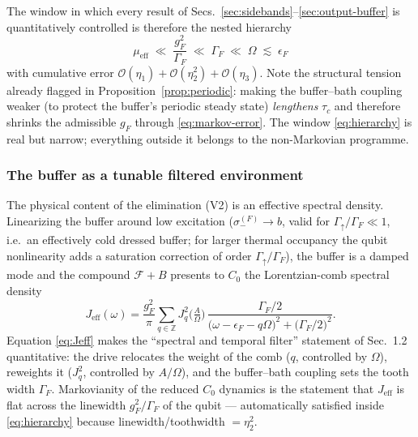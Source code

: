 \documentclass[11pt,a4paper]{article}
\theoremstyle{definition}
\theoremstyle{remark}
\newcommand{\bbZ}{\mathbb{Z}}
\begin{document}
The window in which every result of
Secs.~\ref{sec:sidebands}--\ref{sec:output-buffer} is quantitatively
controlled is therefore the nested hierarchy
\begin{equation}
\boxed{\;
\mu_{\mathrm{eff}} \;\ll\; \frac{g_F^{2}}{\Gamma_F}
\;\ll\; \Gamma_F \;\ll\; \Omega \;\lesssim\; \epsilon_F
\;}
\label{eq:hierarchy}
\end{equation}
with cumulative error
$\mathcal{O}(\eta_1)+\mathcal{O}(\eta_2^2)+\mathcal{O}(\eta_3)$.
Note the structural tension already flagged in
Proposition~\ref{prop:periodic}: making the buffer--bath coupling
weaker (to protect the buffer's periodic steady state) \emph{lengthens}
$\tau_c$ and therefore shrinks the admissible $g_F$ through
\eqref{eq:markov-error}. The window \eqref{eq:hierarchy} is real but
narrow; everything outside it belongs to the non-Markovian programme.
 
\subsubsection{The buffer as a tunable filtered environment}
\label{sec:Jeff}
The physical content of the elimination (V2) is an effective spectral
density. Linearizing the buffer around low excitation
($\sigma_-^{(F)}\!\to b$, valid for
$\Gamma_\uparrow/\Gamma_F \ll 1$, i.e.\ an effectively cold dressed
buffer; for larger thermal occupancy the qubit nonlinearity adds a
saturation correction of order $\Gamma_\uparrow/\Gamma_F$), the
buffer is a damped mode and the compound
$\mathcal{F}\!+\!B$ presents to $C_0$ the Lorentzian-comb spectral
density
\begin{equation}
J_{\mathrm{eff}}(\omega)
= \frac{g_F^{2}}{\pi}
\sum_{q\in\bbZ} J_q^{2}\!\Big(\tfrac{A}{\Omega}\Big)\,
\frac{\Gamma_F/2}{\big(\omega-\epsilon_F-q\Omega\big)^{2}
+ \big(\Gamma_F/2\big)^{2}} .
\label{eq:Jeff}
\end{equation}
Equation \eqref{eq:Jeff} makes the ``spectral and temporal filter''
statement of Sec.~1.2 quantitative: the drive relocates the weight of
the comb ($q$, controlled by $\Omega$), reweights it ($J_q^2$,
controlled by $A/\Omega$), and the buffer--bath coupling sets the
tooth width $\Gamma_F$. Markovianity of the reduced $C_0$ dynamics is
the statement that $J_{\mathrm{eff}}$ is flat across the linewidth
$g_F^2/\Gamma_F$ of the qubit --- automatically satisfied inside
\eqref{eq:hierarchy} because linewidth/toothwidth $=\eta_2^2$.
 
\end{document}
